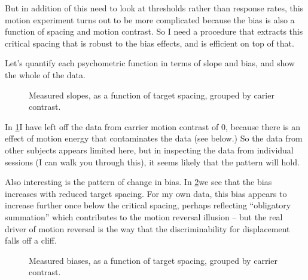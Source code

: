 \documentclass[english,noae]{article}
\begin{document}
But in addition of this need to look at thresholds rather than response
rates, this motion experiment turns out to be more complicated because
the bias is also a function of spacing and motion contrast. So I need
a procedure that extracts this critical spacing that is robust to
the bias effects, and is efficient on top of that.

Let's quantify each psychometric function in terms of slope and bias,
and show the whole of the data.



\begin{figure}





\caption{\label{fig:titrate-slopes}Measured slopes, as a function of target
spacing, grouped by carier contrast.}
\end{figure}


In \ref{fig:titrate-slopes}I have left off the data from carrier
motion contrast of 0, because there is an effect of motion energy
that contaminates the data (see below.) So the data from other subjects
appears limited here, but in inspecting the data from individual sessions
(I can walk you through this), it seems likely that the pattern will
hold.

Also interesting is the pattern of change in bias. In \ref{fig:titrate-bias}we
see that the bias increases with reduced target spacing. For my own
data, this bias appears to increase further once below the critical
spacing, perhaps reflecting ``obligatory summation'' which contributes
to the motion reversal illusion -- but the real driver of motion reversal
is the way that the discriminability for displacement falls off a
cliff.

\begin{figure}





\caption{\label{fig:titrate-bias}Measured biases, as a function of target
spacing, grouped by carrier contrast.}
\end{figure}
\end{document}
